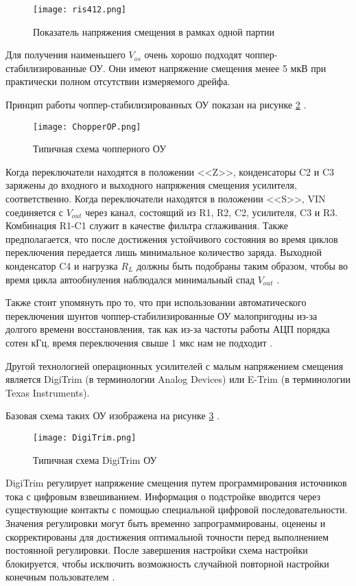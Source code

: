 \begin{figure}[H]
\centering
\texttt{[image: ris412.png]}
\caption{Показатель напряжения смещения в рамках одной партии}
\label{ris:412}
\end{figure}

Для получения наименьшего $V_{os}$ очень хорошо подходят чоппер-стабилизированные ОУ. Они имеют напряжение 
смещения менее 5 мкВ при практически полном отсутствии измеряемого дрейфа. 

Принцип работы чоппер-стабилизированных ОУ показан на рисунке \ref{ris:ChopperOP} \cite{MT-055:Tutorial}.

\begin{figure}[H]
\centering
\texttt{[image: ChopperOP.png]}
\caption{Типичная схема чопперного ОУ}
\label{ris:ChopperOP}
\end{figure}


Когда переключатели находятся в положении <<Z>>, конденсаторы C2 и C3 заряжены до входного и выходного
напряжения смещения усилителя, соответственно. Когда переключатели находятся в положении <<S>>, 
VIN соединяется с $V_{out}$ через канал, состоящий из R1, R2, C2, усилителя, C3 и R3. Комбинация R1-C1 служит в 
качестве фильтра сглаживания. Также предполагается, что после достижения устойчивого состояния во время 
циклов переключения передается лишь минимальное количество заряда. Выходной конденсатор C4 и нагрузка $R_{L}$ 
должны быть подобраны таким образом, чтобы во время цикла автообнуления наблюдался минимальный спад $V_{out}$ 
\cite{MT-055:Tutorial}.

Также стоит упомянуть про то, что при использовании автоматического переключения шунтов 
чоппер-стабилизированные ОУ малопригодны из-за долгого времени восстановления, так как из-за частоты работы
АЦП порядка сотен кГц, время переключения свыше 1 мкс нам не подходит \cite{Chopper:OU}.

Другой технологией операционных усилителей с малым напряжением смещения является DigiTrim (в терминологии Analog 
Devices) или E-Trim (в терминологии Texas Instruments).

Базовая схема таких ОУ изображена на рисунке \ref{ris:DigiTrim} \cite{MT-037:Tutorial}.

\begin{figure}[H]
\centering
\texttt{[image: DigiTrim.png]}
\caption{Типичная схема DigiTrim ОУ}
\label{ris:DigiTrim}
\end{figure}

DigiTrim регулирует напряжение смещения путем программирования источников тока с цифровым взвешиванием. 
Информация о подстройке вводится через существующие контакты с помощью специальной цифровой последовательности. 
Значения регулировки могут быть временно запрограммированы, оценены и скорректированы для достижения 
оптимальной точности перед выполнением постоянной регулировки. 
После завершения настройки схема настройки блокируется, чтобы исключить возможность случайной повторной 
настройки конечным пользователем \cite{MT-037:Tutorial}. 

